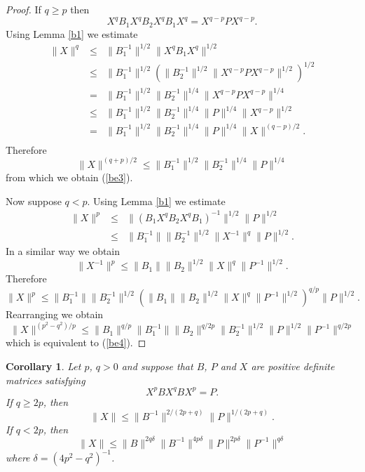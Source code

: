 \documentclass{amsart}
\newtheorem{cor}[thm]{Corollary}
\theoremstyle{definition}
\theoremstyle{remark}
\numberwithin{equation}{section}
\newcommand{\<}{\langle}
\renewcommand{\>}{\rangle}
\begin{document}
\begin{proof}
If $q\geq p$ then
\[ X^q B_1 X^q B_2 X^q B_1 X^q = X^{q-p} P X^{q-p}.\]
Using Lemma \ref{b1} we estimate
\begin{eqnarray*}
\| X \|^q & \leq & \| B_1^{-1} \|^{1/2} \|X^q B_1 X^q \|^{1/2}\\
& \leq & \| B_1^{-1} \|^{1/2} \left( \| B_2^{-1} \|^{1/2} \|
X^{q-p} P X^{q-p} \|^{1/2} \right)^{1/2}\\
& = & \| B_1^{-1} \|^{1/2} \| B_2^{-1} \|^{1/4} \| X^{q-p} P
X^{q-p} \|^{1/4}\\
& \leq & \| B_1^{-1} \|^{1/2} \| B_2^{-1} \|^{1/4} \| P \|^{1/4}
\| X^{q-p} \|^{1/2}\\
& = & \| B_1^{-1} \|^{1/2} \| B_2^{-1} \|^{1/4} \| P \|^{1/4} \| X
\|^{(q-p)/2}.\\
\end{eqnarray*}
Therefore
\begin{equation*}
\| X \|^{(q+p)/2} \leq \| B_1^{-1} \|^{1/2} \| B_2^{-1} \|^{1/4}
\| P \|^{1/4}
\end{equation*}
from which we obtain (\ref{be3}).

Now suppose $q < p$. Using Lemma \ref{b1} we estimate
\begin{eqnarray*}
\| X \|^p & \leq & \|(B_1 X^q B_2 X^q B_1)^{-1}\|^{1/2} \| P
\|^{1/2}\\
& \leq & \| B_1^{-1} \| \|B_2^{-1} \|^{1/2} \|X^{-1}\|^q
\|P\|^{1/2}.
\end{eqnarray*}
In a similar way we obtain
\[ \| X^{-1} \|^p \leq \| B_1 \| \|B_2 \|^{1/2} \|X \|^q
\|P^{-1} \|^{1/2}.\] Therefore
\begin{equation*}
\| X \|^p \leq \| B_1^{-1} \| \|B_2^{-1} \|^{1/2} \left( \| B_1 \|
\|B_2 \|^{1/2} \|X \|^q \|P^{-1} \|^{1/2} \right)^{q/p}
\|P\|^{1/2}.
\end{equation*}
Rearranging we obtain
\begin{equation*}
\| X \|^{(p^2-q^2)/p} \leq \| B_1 \|^{q/p} \| B_1^{-1} \| \|B_2
\|^{q/2p} \|B_2^{-1} \|^{1/2} \|P\|^{1/2} \|P^{-1} \|^{q/2p}
\end{equation*}
which is equivalent to (\ref{be4}).
\end{proof}

\begin{cor}
Let $p$, $q > 0$ and suppose that $B$, $P$ and $X$ are positive
definite matrices satisfying
\[ X^p B X^q B X^p = P.\]
If $q\geq 2p$, then
\[ \| X \| \leq \| B^{-1} \|^{2/(2p+q)} \| P \|^{1/(2p+q)}.\]
If $q < 2p$, then
\[ \| X \| \leq \|B \|^{2q\delta} \|B^{-1}\|^{4p\delta}
\| P \|^{2p\delta} \| P^{-1}\|^{q\delta} \] where $\delta =
(4p^2-q^2)^{-1}$.
\end{cor}
\end{document}

